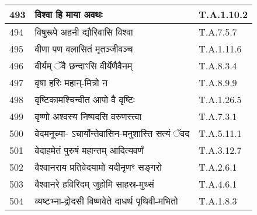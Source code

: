 \documentclass[17pt]{extarticle}
\begin{document}
\begin{longtable}{||p{0.4in}||p{4.9in}||p{0.9in}||}
    \hline
        
    493 & विश्वा हि माया अवथः & T.A.1.10.2       \\
    
    \hline
        
    494 & विषुरूपे अहनी द्यौरिवासि विश्वा & T.A.7.5.7       \\
    
    \hline
        
    495 & वीणा पण वलासितं मृतञ्जीवञ्च & T.A.1.11.6       \\
    
    \hline
        
    496 & वीर्यम् ॅवै छन्दाꣳसि वीर्येणैवैनम् & T.A.8.3.4       \\
    
    \hline
        
    497 & वृषा हरिः महान्{-}मित्रो न & T.A.8.9.9       \\
    
    \hline
        
    498 & वृष्टिकामश्चिन्वीत आपो वै वृष्टिः & T.A.1.26.5       \\
    
    \hline
        
    499 & वृष्णो अश्वस्य निष्पदसि वरुणस्त्वा & T.A.7.3.1       \\
    
    \hline
        
    500 & वेदमनूच्या{-} ऽचार्योन्तेवासिन{-}मनुशास्ति सत्यं ॅवद & T.A.5.11.1       \\
    
    \hline
        
    501 & वेदाहमेतं पुरुषं महान्तम् आदित्यवर्णं & T.A.3.12.7       \\
    
    \hline
        
    502 & वैश्वानराय प्रतिवेदयामो यदीनृणꣳ सङ्गरो & T.A.2.6.1       \\
    
    \hline
        
    503 & वैश्वानरे हविरिदम् जुहोमि साहस्र{-}मुथ्सं & T.A.4.6.1       \\
    
    \hline
        
    504 & व्यष्टभ्ना{-}द्रोदसी विष्णवेते दाधर्थ पृथिवी{-}मभितो & T.A.1.8.3       \\
    
    \hline
        

\end{longtable}
\end{document}
